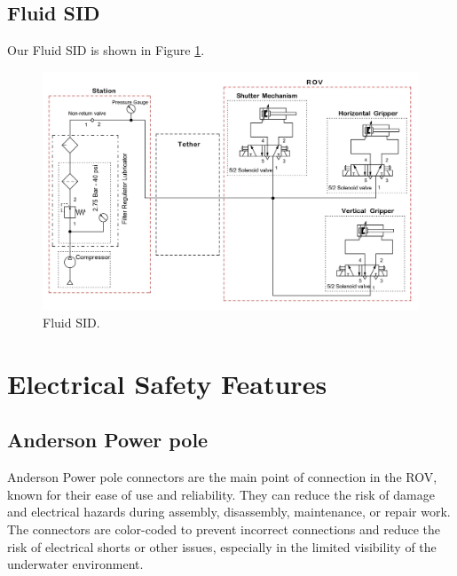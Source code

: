 \documentclass[11pt, twocolumn]{article}
\begin{document}
\subsection{Fluid SID}

Our Fluid SID is shown in Figure \ref{fig:fluid_sid}.

\begin{figure}[h!]
    \centering
    \includegraphics[width=\columnwidth]{Images/Pneumatic SID.jpg}
    \caption{Fluid SID.}
    \label{fig:fluid_sid}
\end{figure}

\section{Electrical Safety Features}

\subsection{Anderson Power pole}

Anderson Power pole connectors are the main point of connection in the ROV, known for their ease of use and reliability. They can reduce the risk of damage and electrical hazards during assembly, disassembly, maintenance, or repair work. The connectors are color-coded to prevent incorrect connections and reduce the risk of electrical shorts or other issues, especially in the limited visibility of the underwater environment.
\end{document}
